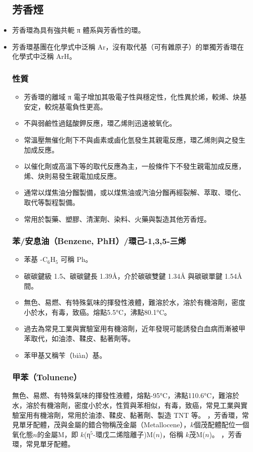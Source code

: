 \documentclass[a4paper,12pt]{report}
\begin{document}
\begin{itemize}
\subsection{芳香烴}
\bit
\item 芳香環為具有強共軛 π 體系與芳香性的環。
\item 芳香環基團在化學式中泛稱 Ar，沒有取代基（可有雜原子）的單獨芳香環在化學式中泛稱 ArH。
\eit
\subsubsection{性質}
\begin{itemize}
\item 芳香環的離域 π 電子增加其吸電子性與穩定性，化性異於烯，較烯、炔基安定，較烷基電負性更高。
\item 不與弱鹼性過錳酸鉀反應，環乙烯則迅速被氧化。
\item 常溫壓無催化劑下不與鹵素或鹵化氫發生其親電反應，環乙烯則與之發生加成反應。
\item 以催化劑或高溫下等的取代反應為主，一般條件下不發生親電加成反應，烯、炔則易發生親電加成反應。
\item 通常以煤焦油分餾製備，或以煤焦油或汽油分餾再經裂解、萃取、環化、取代等製程製備。
\item 常用於製藥、塑膠、清潔劑、染料、火藥與製造其他芳香烴。
\end{itemize}
\subsubsection{苯/安息油（Benzene, PhH）/環己-1,3,5-三烯}
\begin{itemize}
\item 苯基 -C$_6$H$_5$ 可稱 Ph。
\item 碳碳鍵級 1.5、碳碳鍵長 1.39Å，介於碳碳雙鍵 1.34Å 與碳碳單鍵 1.54Å 間。
\item 無色、易燃、有特殊氣味的揮發性液體，難溶於水，溶於有機溶劑，密度小於水，有毒，致癌。熔點5.5°C，沸點80.1°C。
\item 過去為常見工業與實驗室用有機溶劑，近年發現可能誘發白血病而漸被甲苯取代，如油漆、鞣皮、黏著劑等。
\item 苯甲基又稱苄（biàn）基。
\end{itemize}
\subsubsection{甲苯（Tolunene）}
無色、易燃、有特殊氣味的揮發性液體，熔點-95°C，沸點110.6°C，難溶於水，溶於有機溶劑，密度小於水，性質與苯相似，有毒，致癌，常見工業與實驗室用有機溶劑，常用於油漆、鞣皮、黏著劑、製造 TNT 等。
，芳香環，常見單牙配體，茂與金屬的錯合物稱茂金屬（Metallocene），$k$個茂配體配位一個氧化態$n$的金屬M，即 $k$(η$^5$-環戊二烯陰離子)M($n$)，俗稱 $k$茂M($n$)。
，芳香環，常見單牙配體。

\end{itemize}
\end{document}
